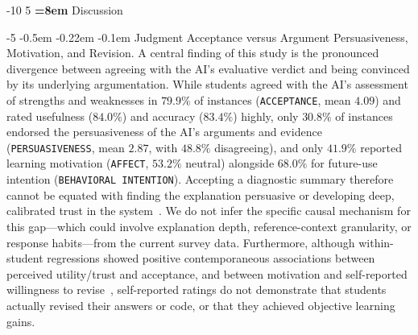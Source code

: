 \documentclass{llncs}
\makeatletter
\renewcommand\section{\@startsection{section}{1}{\z@}%
                       {-10\p@ \@plus -2\p@ \@minus -2\p@}%
                       {5\p@ \@plus 1\p@ \@minus 1\p@}%
                       {\normalfont\large\bfseries\boldmath
                        \rightskip=\z@ \@plus 8em\pretolerance=10000 }}
\renewcommand\paragraph{\@startsection{paragraph}{4}{\z@}%
                       {-5\p@ \@plus -1\p@ \@minus -1\p@}%
                       {-0.5em \@plus -0.22em \@minus -0.1em}%
                       {\normalfont\normalsize\itshape}}
\makeatother
\begin{document}
\section{Discussion}
\label{sec:discussion}

\paragraph{Judgment Acceptance versus Argument Persuasiveness, Motivation, and Revision.}
A central finding of this study is the pronounced divergence between agreeing with the AI's evaluative verdict and being convinced by its underlying argumentation. While students agreed with the AI's assessment of strengths and weaknesses in $79.9\%$ of instances (\texttt{ACCEPTANCE}, mean $4.09$) and rated usefulness ($84.0\%$) and accuracy ($83.4\%$) highly, only $30.8\%$ of instances endorsed the persuasiveness of the AI's arguments and evidence (\texttt{PERSUASIVENESS}, mean $2.87$, with $48.8\%$ disagreeing), and only $41.9\%$ reported learning motivation (\texttt{AFFECT}, $53.2\%$ neutral) alongside $68.0\%$ for future-use intention (\texttt{BEHAVIORAL INTENTION}). Accepting a diagnostic summary therefore cannot be equated with finding the explanation persuasive or developing deep, calibrated trust in the system~\cite{lee2004trust}. We do not infer the specific causal mechanism for this gap—which could involve explanation depth, reference-context granularity, or response habits—from the current survey data. Furthermore, although within-student regressions showed positive contemporaneous associations between perceived utility/trust and acceptance, and between motivation and self-reported willingness to revise~\cite{davis1989perceived,venkatesh2003user}, self-reported ratings do not demonstrate that students actually revised their answers or code, or that they achieved objective learning gains.
\end{document}
